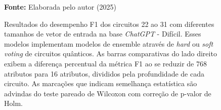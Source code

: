 \begin{figure}
\caption{Resultados do desempenho F1 dos circuitos 22 ao 31 com diferentes tamanhos de vetor de entrada na base \textit{ChatGPT} - Difícil. Esses modelos implementam modelos de ensemble através de \textit{hard} ou \textit{soft voting} de circuitos quânticos. As barras comparativas do lado direito exibem a diferença percentual da métrica F1 ao se reduzir de 768 atributos para 16 atributos, divididos pela profundidade de cada circuito. As marcações que indicam semelhança estatística são advindas do teste pareado de Wilcoxon com correção de p-valor de Holm.}
\label{fig:n_features:hard:g7}
     \centering
    \centering
      \par\medskip\ABNTEXfontereduzida\selectfont\textbf{Fonte:} Elaborada pelo autor (2025) \par\medskip
\end{figure}